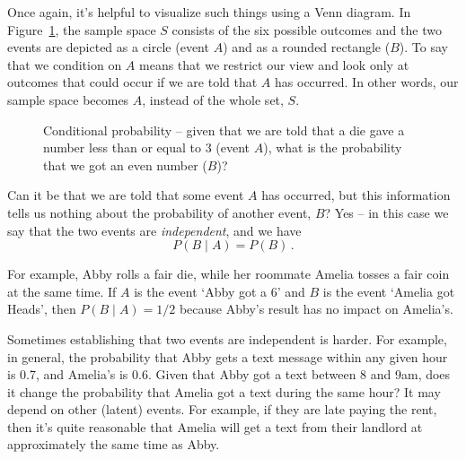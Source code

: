 Once again, it's helpful to visualize such things using a Venn diagram. In
Figure~\ref{fig:ch3:probability-conditional}, the sample space $S$ consists of the
six possible outcomes and the two events are depicted as a circle (event $A$)
and as a rounded rectangle ($B$). To say that we condition on $A$ means that we
restrict our view and look only at outcomes that could occur if we are told
that $A$ has occurred. In other words, our sample space becomes $A$, instead of
the whole set, $S$.

\begin{figure}[htbp]
\caption{Conditional probability -- given that we are told that a die gave a
number less than or equal to 3 (event $A$), what is the probability that we got
an even number ($B$)?} \label{fig:ch3:probability-conditional}
\end{figure}

\bigskip
Can it be that we are told that some event $A$ has occurred, but this
information tells us nothing about the probability of another event, $B$? Yes
-- in this case we say that the two events are \emph{independent}, and we have
$$P(B\mid A) = P(B)\,.$$ 

For example, Abby rolls a fair die, while her roommate Amelia tosses a fair
coin at the same time. If $A$ is the event `Abby got a 6' and $B$ is the event
`Amelia got Heads', then $P(B\mid A) = 1/2$ because Abby's result has no impact
on Amelia's. 

Sometimes establishing that two events are independent is harder. For example,
in general, the probability that Abby gets a text message within any given hour
is 0.7, and Amelia's is 0.6. Given that Abby got a text between 8 and 9am, does
it change the probability that Amelia got a text during the same hour? It may
depend on other (latent) events. For example, if they are late paying the rent,
then it's quite reasonable that Amelia will get a text from their landlord at
approximately the same time as Abby. 

